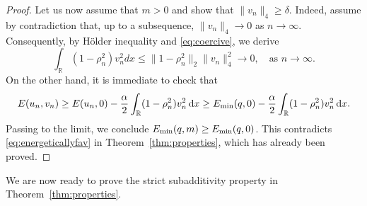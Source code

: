 \documentclass[11pt]{article}
\newcommand{\R}{\mathbb{R}}
\newcommand{\Emin}{E_\textup{min}}
\renewcommand{\d}{\,\mathrm{d}}
\theoremstyle{plain}
\theoremstyle{definition}
\theoremstyle{remark}
\numberwithin{equation}{section}
\begin{document}
{\begin{proof}
    Let us now assume that $m>0$ and show that $\|v_n\|_4\geq\delta$. Indeed, assume by contradiction that, up to a subsequence, $\|v_n\|_4\to 0$ as $n\to\infty$. Consequently, by H\"older inequality and \eqref{eq:coercive}, we derive
    \begin{equation*}
        \int_\R(1-\rho_n^2)v_n^2dx\leq \|1-\rho_n^2\|_2\|v_n\|_4^2\to 0,\quad\text{as }n\to\infty.
    \end{equation*}
    On the other hand, it is immediate to check that
    \[E(u_n,v_n)\geq E(u_n,0)-\frac{\alpha}{2}\int_\R(1-\rho_n^2)v_n^2{\d x}\geq \Emin(q,0)-\frac{\alpha}{2}\int_\R(1-\rho_n^2)v_n^2{\d x}.\]
    Passing to the limit, we conclude $\Emin(q,m)\geq \Emin(q,0)$. This contradicts \eqref{eq:energeticallyfav} in Theorem~\ref{thm:properties}, which has already been proved.
\end{proof}

We are now ready to prove the strict subadditivity property in Theorem~\ref{thm:properties}.

}
\end{document}

